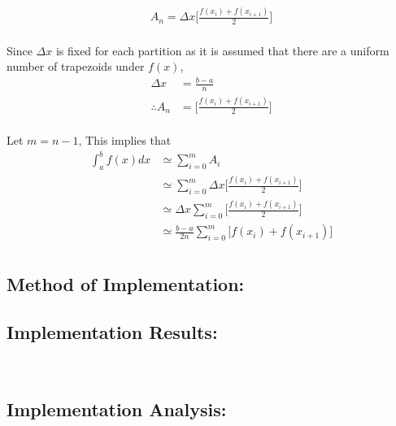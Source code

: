 \documentclass[11pt]{article}
\begin{document}
\begin{page}
\begin{equation}
\begin{aligned}
    A_n = \Delta{x}\Bigg[\frac{f(x_i) + f(x_{i+1})}{2}\Bigg]
\end{aligned}
\end{equation}\\

\noindent Since $\Delta{x}$ is fixed for each partition as it is assumed that there are a uniform number of trapezoids under $f(x)$,\\

\begin{equation}
\begin{aligned}
    \Delta{x} &= \frac{b-a}{n}\\
    \therefore{A_n} &= \Bigg[\frac{f(x_i) + f(x_{i+1})}{2}\Bigg]
\end{aligned}
\end{equation}\\

\noindent Let $m = n-1$, This implies that\\

\begin{equation}
\begin{aligned}
    \int_a^b f(x) dx &\simeq \sum_{i=0}^{m}A_i\\
    &\simeq \sum_{i=0}^{m} \Delta{x} \Bigg[\frac{f(x_i) + f(x_{i+1})}{2}\Bigg]\\
    &\simeq \Delta{x} \sum_{i=0}^{m} \Bigg[\frac{f(x_i) + f(x_{i+1})}{2}\Bigg]\\
    &\simeq \frac{b-a}{2n} \sum_{i=0}^{m} \Bigg[f(x_i) + f(x_{i+1})\Bigg]\\
\end{aligned}
\end{equation}

\subsection{Method of Implementation:}


\subsection{Implementation Results:}\\

\subsection{Implementation Analysis:}\\


\end{page}
\end{document}
